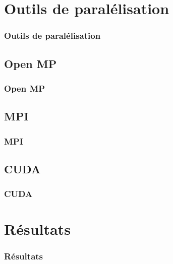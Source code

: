\documentclass[10pt]{beamer}
\begin{document}
\section{Outils de paralélisation}

\begin{frame}
    \frametitle{Outils de paralélisation}
    \tableofcontents[currentsection]
\end{frame}

\subsection{Open MP}
\begin{frame}
    \frametitle{Open MP}
\end{frame}

\subsection{MPI}
\begin{frame}
    \frametitle{MPI}
\end{frame}

\subsection{CUDA}
\begin{frame}
    \frametitle{CUDA}
\end{frame}

\section{Résultats}

\begin{frame}
    \frametitle{Résultats}
    \tableofcontents[currentsection]
\end{frame}
\end{document}
